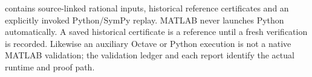  contains source-linked rational inputs, historical
reference certificates and an explicitly invoked Python/SymPy replay.
MATLAB never launches Python automatically. A saved historical certificate
is a reference until a fresh verification is recorded. Likewise an auxiliary
Octave or Python execution is not a native MATLAB validation; the validation
ledger and each report identify the actual runtime and proof path.

